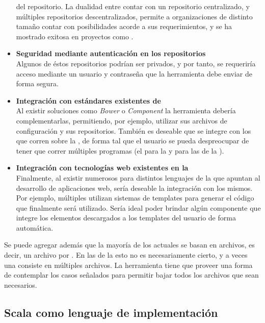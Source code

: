 \begin{itemize}
		del repositorio. La dualidad entre contar con un repositorio 
		centralizado, y múltiples repositorios descentralizados, permite a 
		organizaciones de distinto tamaño contar con posibilidades acorde a sus 
		requerimientos, y se ha mostrado exitosa en proyectos como \maven.
	\item \textbf{Seguridad mediante autenticación en los repositorios}\\
		Algunos de éstos repositorios podrían ser privados, y por tanto, se 
		requeriría acceso mediante un usuario y contraseña que la herramienta 
		debe enviar de forma segura.
	\item \textbf{Integración con estándares existentes de \depmgrs}\\
		Al existir soluciones como \emph{Bower} o \emph{Component} la 
		herramienta debería complementarlas, permitiendo, por ejemplo, utilizar 
		sus archivos de configuración y sus repositorios. También es deseable 
		que se integre con los \depmgrs que corren sobre la \jvm, de forma tal 
		que el usuario se pueda despreocupar de tener que correr múltiples 
		programas (el \depmgr para la \logictier y \fronttier para las 
		\dependencies de la \viewtier).
	\item \textbf{Integración con tecnologías web existentes en la \jvm}\\
		Finalmente, al existir numerosos \frameworks para distintos lenguajes 
		de la \jvm que apuntan al desarrollo de aplicaciones web, sería 
		deseable la integración con los mismos. Por ejemplo, múltiples 
		\frameworks utilizan sistemas de templates para generar el código \html 
		que finalmente será utilizado. Sería ideal poder brindar algún 
		componente que integre los elementos descargados a los templates del 
		usuario de forma automática.
\end{itemize}


Se puede agregar además que la mayoría de los \depmgrs actuales se basan en 
archivos, es decir, un archivo por \dependency. En las \dependencies de la 
\viewtier esto no es necesariamente cierto, y a veces una \dependency consiste 
en múltiples archivos. La herramienta tiene que proveer una forma de 
contemplar los casos señalados para permitir bajar todos los archivos que sean 
necesarios.\\

\subsection{Scala como lenguaje de implementación}
\label{subsec:solution:technology}

